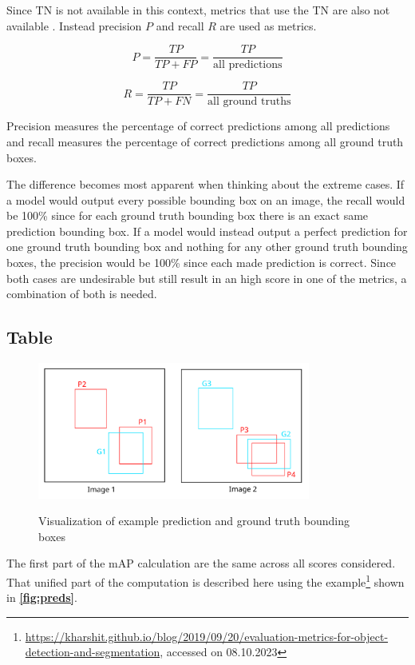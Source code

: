 \documentclass[10pt]{book}
\newcommand{\figureref}[1]{\textbf{\autoref{#1}}}
\begin{document}
Since \ac{TN} is not available in this context, metrics that use the \ac{TN} are also not available \cite{padilla2020survey}. Instead precision $P$ and recall $R$ are used as metrics.

$$P = \frac{TP}{TP + FP} = \frac{TP}{\text{all predictions}}$$

$$R = \frac{TP}{TP + FN} = \frac{TP}{\text{all ground truths}}$$

Precision measures the percentage of correct predictions among all predictions and recall measures the percentage of correct predictions among all ground truth boxes. 

The difference becomes most apparent when thinking about the extreme cases. If a model would output every possible bounding box on an image, the recall would be 100\% since for each ground truth bounding box there is an exact same prediction bounding box. If a model would instead output a perfect prediction for one ground truth bounding box and nothing for any other ground truth bounding boxes, the precision would be 100\% since each made prediction is correct. Since both cases are undesirable but still result in an high score in one of the metrics, a combination of both is needed.

\subsection{Table}

\begin{figure}
  \caption{Visualization of example prediction and ground truth bounding boxes}
  \includegraphics[width=0.8\textwidth]{image/preds}
  \label{fig:preds}
\end{figure}

The first part of the \ac{mAP} calculation are the same across all scores considered. That unified part of the computation is described here using the example\footnote{\url{https://kharshit.github.io/blog/2019/09/20/evaluation-metrics-for-object-detection-and-segmentation}, accessed on 08.10.2023} shown in \figureref{fig:preds}. 
\end{document}
